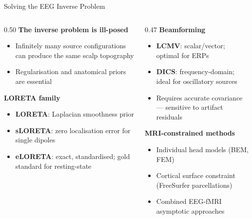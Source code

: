 

\begin{frame}{Solving the EEG Inverse Problem}
  \begin{columns}[T]
    \begin{column}{0.50\textwidth}
      \textbf{The inverse problem is ill-posed}
      \begin{itemize}
        \item Infinitely many source configurations can produce the same scalp topography
        \item Regularisation and anatomical priors are essential
      \end{itemize}
      \vspace{0.4em}
      \textbf{LORETA family} \cite{PascualMarqui1994}
      \begin{itemize}
        \item \textbf{LORETA}: Laplacian smoothness prior
        \item \textbf{sLORETA}: zero localisation error for single dipoles
        \item \textbf{eLORETA}: exact, standardised; gold standard for resting-state
      \end{itemize}
    \end{column}
    \begin{column}{0.47\textwidth}
      \textbf{Beamforming}
      \begin{itemize}
        \item \textbf{LCMV}: scalar/vector; optimal for ERPs
        \item \textbf{DICS}: frequency-domain; ideal for oscillatory sources \cite{Gross2001}
        \item Requires accurate covariance — sensitive to artifact residuals
      \end{itemize}
      \vspace{0.3em}
      \textbf{MRI-constrained methods}
      \begin{itemize}
        \item Individual head models (BEM, FEM)
        \item Cortical surface constraint (FreeSurfer parcellations)
        \item Combined EEG-fMRI asymptotic approaches
      \end{itemize}
    \end{column}
  \end{columns}
\end{frame}
